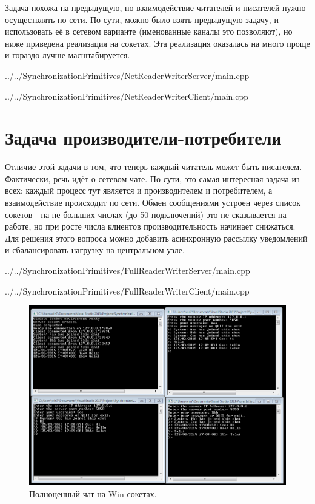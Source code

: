 \documentclass[a4paper, 12pt]{article}		%
\begin{document}
Задача похожа на предыдущую, но взаимодействие читателей и писателей нужно осуществлять по сети. По сути, можно было взять предыдущую задачу, и использовать её в сетевом варианте (именованные каналы это позволяют), но ниже приведена реализация на сокетах. Эта реализация оказалась на много проще и гораздо лучше масштабируется.


{../../SynchronizationPrimitives/NetReaderWriterServer/main.cpp}


{../../SynchronizationPrimitives/NetReaderWriterClient/main.cpp}

\newpage
\section{Задача производители-потребители}

Отличие этой задачи в том, что теперь каждый читатель может быть писателем. Фактически, речь идёт о сетевом чате. По сути, это самая интересная задача из всех: каждый процесс тут является и производителем и потребителем, а взаимодействие происходит по сети. Обмен сообщениями устроен через список сокетов - на не больших числах (до 50 подключений) это не сказывается на работе, но при росте числа клиентов производительность начинает снижаться. Для решения этого вопроса можно добавить асинхронную рассылку уведомлений и сбалансировать нагрузку на центральном узле.


{../../SynchronizationPrimitives/FullReaderWriterServer/main.cpp}


{../../SynchronizationPrimitives/FullReaderWriterClient/main.cpp}

\begin{figure}[h!]
\centering
\includegraphics[scale=0.7]{res/009}
\caption{Полноценный чат на Win-сокетах.}
\end{figure}
\end{document}
